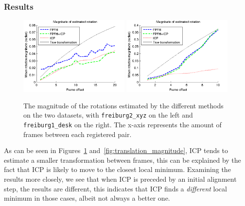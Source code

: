 \documentclass[a4paper]{article}
\begin{document}
\subsubsection{Results}

\begin{figure}[H]
    \centering
        \includegraphics[width=0.49\textwidth]{ims/xyzMagnitudeofestimatedrotation.png}
        \includegraphics[width=0.49\textwidth]{ims/deskMagnitudeofestimatedrotation.png}
    \caption{The magnitude of the rotations estimated by the different methods on the two datasets, with \texttt{freiburg2\_xyz} on the left and \texttt{freiburg1\_desk} on the right. The x-axis represents the amount of frames between each registered pair.}
    \label{fig:rotation_magnitude}
\end{figure}

As can be seen in Figures~\ref{fig:rotation_magnitude} and~\ref{fig:translation_magnitude}, ICP tends to estimate a smaller transformation between frames, this can be explained by the fact that ICP is likely to move to the closest local minimum. Examining the results more closely, we see that when \ac{ICP} is preceded by an initial alignment step, the results are different, this indicates that \ac{ICP} finds a \emph{different} local minimum in those cases, albeit not always a better one.
\end{document}

